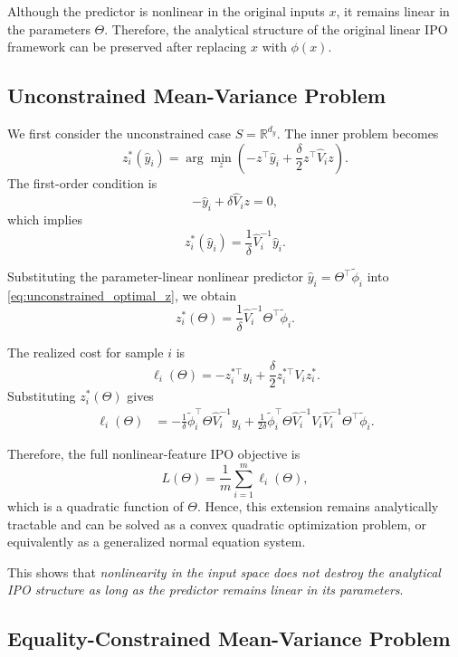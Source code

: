 \documentclass{article}
\begin{document}
Although the predictor is nonlinear in the original inputs $x$, it remains linear in the parameters $\Theta$. Therefore, the analytical structure of the original linear IPO framework can be preserved after replacing $x$ with $\phi(x)$.

\subsection{Unconstrained Mean-Variance Problem}

We first consider the unconstrained case $S=\mathbb{R}^{d_y}$. The inner problem becomes
\[
z_i^*(\hat y_i)
=
\arg\min_{z}
\left(
-z^\top \hat y_i + \frac{\delta}{2} z^\top \hat V_i z
\right).
\]
The first-order condition is
\[
-\hat y_i + \delta \hat V_i z = 0,
\]
which implies
\begin{equation}
z_i^*(\hat y_i)
=
\frac{1}{\delta}\hat V_i^{-1}\hat y_i.
\label{eq:unconstrained_optimal_z}
\end{equation}

Substituting the parameter-linear nonlinear predictor $\hat y_i=\Theta^\top \tilde\phi_i$ into \eqref{eq:unconstrained_optimal_z}, we obtain
\[
z_i^*(\Theta)
=
\frac{1}{\delta}\hat V_i^{-1}\Theta^\top \tilde\phi_i.
\]

The realized cost for sample $i$ is
\[
\ell_i(\Theta)
=
-z_i^{*\top} y_i
+\frac{\delta}{2} z_i^{*\top} V_i z_i^*.
\]
Substituting $z_i^*(\Theta)$ gives
\begin{align}
\ell_i(\Theta)
&=
-\frac{1}{\delta}\tilde\phi_i^\top \Theta \hat V_i^{-1} y_i
+
\frac{1}{2\delta}
\tilde\phi_i^\top
\Theta \hat V_i^{-1} V_i \hat V_i^{-1}
\Theta^\top \tilde\phi_i.
\label{eq:loss_theta_unconstrained}
\end{align}

Therefore, the full nonlinear-feature IPO objective is
\begin{equation}
L(\Theta)
=
\frac{1}{m}\sum_{i=1}^m \ell_i(\Theta),
\label{eq:full_loss_unconstrained}
\end{equation}
which is a quadratic function of $\Theta$. Hence, this extension remains analytically tractable and can be solved as a convex quadratic optimization problem, or equivalently as a generalized normal equation system.

This shows that \emph{nonlinearity in the input space does not destroy the analytical IPO structure as long as the predictor remains linear in its parameters}.

\subsection{Equality-Constrained Mean-Variance Problem}
\end{document}
